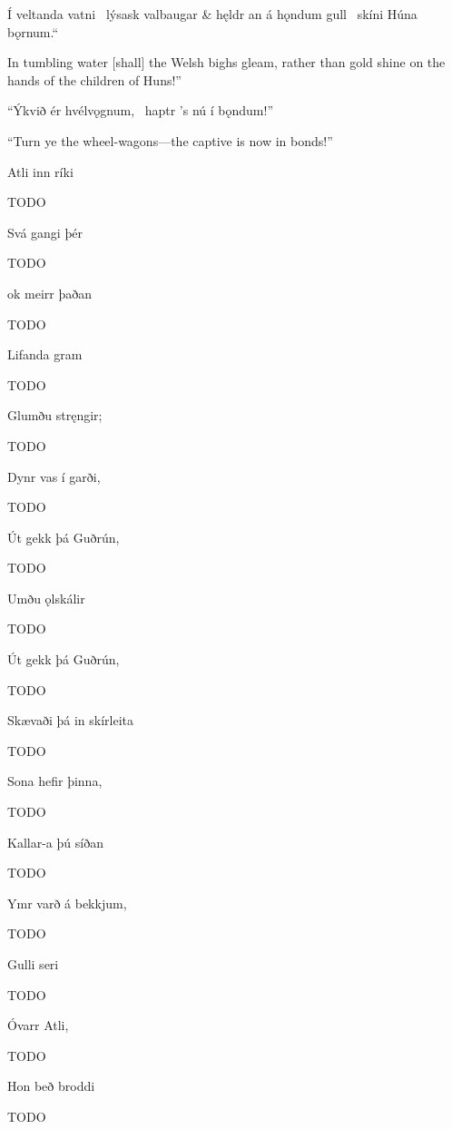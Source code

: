 \bvg
\bva Í veltanda vatni \hld\ lýsask valbaugar &
hęldr an á hǫndum gull \hld\ skíni Húna bǫrnum.“\eva

\bvb In tumbling water [shall] the Welsh bighs gleam, rather than gold shine on the hands of the children of Huns!”\evb
\evg


\bvg
\bva “Ýkvið ér hvélvǫgnum, \hld\ haptr ’s nú í bǫndum!”\eva

\bvb “Turn ye the wheel-wagons—the captive is now in bonds!”\evb
\evg


\bvg
\bva Atli inn ríki\eva

\bvb TODO\evb
\evg


\bvg
\bva Svá gangi þér\eva

\bvb TODO\evb
\evg


\bvg
\bva ok meirr þaðan\eva

\bvb TODO\evb
\evg


\bvg
\bva Lifanda gram\eva

\bvb TODO\evb
\evg


\bvg
\bva Glumðu stręngir;\eva

\bvb TODO\evb
\evg


\bvg
\bva Dynr vas í garði,\eva

\bvb TODO\evb
\evg


\bvg
\bva Út gekk þá Guðrún,\eva

\bvb TODO\evb
\evg


\bvg
\bva Umðu ǫlskálir\eva

\bvb TODO\evb
\evg


\bvg
\bva Út gekk þá Guðrún,\eva

\bvb TODO\evb
\evg


\bvg
\bva Skævaði þá in skírleita\eva

\bvb TODO\evb
\evg


\bvg
\bva Sona hefir þinna, \eva

\bvb TODO\evb
\evg


\bvg
\bva Kallar-a þú síðan \eva

\bvb TODO\evb
\evg


\bvg
\bva Ymr varð á bekkjum, \eva

\bvb TODO\evb
\evg


\bvg
\bva Gulli seri \eva

\bvb TODO\evb
\evg


\bvg
\bva Óvarr Atli, \eva

\bvb TODO\evb
\evg


\bvg
\bva Hon beð broddi \eva

\bvb TODO\evb
\evg


